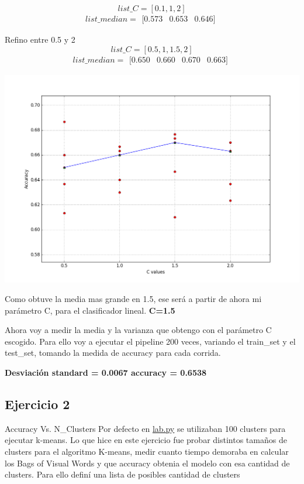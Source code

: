 \documentclass[11pt, spanish, a4paper]{article}
\begin{document}
$$list\_C = [0.1, 1, 2]$$
$$list\_median = \begin{matrix} [0.573 & 0.653 & 0.646]\end{matrix}$$

Refino entre 0.5 y 2
$$list\_C = [0.5, 1, 1.5, 2]$$
$$list\_median = \begin{matrix}[0.650 & 0.660 & 0.670 & 0.663]\end{matrix}$$


\includegraphics[scale=0.5, width=\textwidth]{figure_2.png}


Como obtuve la media mas grande en 1.5, ese será a partir de ahora mi parámetro C, para el clasificador lineal. \textbf{C=1.5}

Ahora voy a medir la media y la varianza que obtengo con el parámetro C escogido.
Para ello voy a ejecutar el pipeline 200 veces, variando el train\_set y el test\_set, tomando la medida de accuracy para cada corrida.

\textbf{Desviación standard = 0.0067  accuracy = 0.6538}



\subsection{Ejercicio 2}
\label{ejercicio2}
Accuracy Vs. N\_Clusters
Por defecto en \href{https://drive.google.com/file/d/0B6mRi0ta2K1rRmRmRUlTblNzX0k/view?usp=sharing}{lab.py} se utilizaban 100 clusters para ejecutar k-means. Lo que hice en este ejercicio fue probar distintos tamaños de clusters para el algoritmo K-means, medir cuanto tiempo demoraba en calcular los Bags of Visual Words y que accuracy obtenia el modelo con esa cantidad de clusters. Para ello definí una lista de posibles cantidad de clusters
\end{document}
